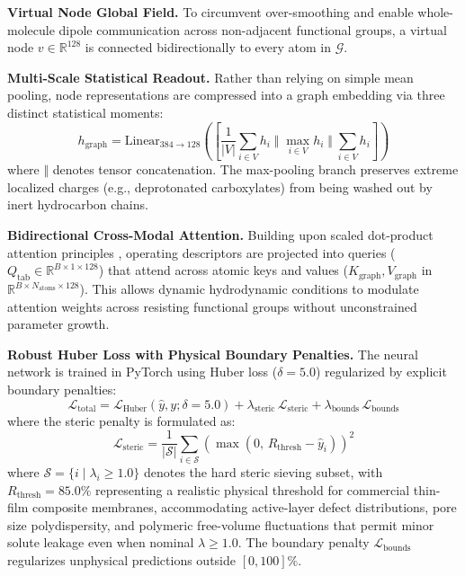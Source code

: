 \documentclass[11pt]{article}
\begin{document}
\textbf{Virtual Node Global Field.} To circumvent over-smoothing and enable whole-molecule dipole communication across non-adjacent functional groups, a virtual node $v \in \mathbb{R}^{128}$ is connected bidirectionally to every atom in $\mathcal{G}$.

\textbf{Multi-Scale Statistical Readout.} Rather than relying on simple mean pooling, node representations are compressed into a graph embedding via three distinct statistical moments:
\begin{equation}
h_{\mathrm{graph}} = \mathrm{Linear}_{384 \to 128} \left( \left[ \frac{1}{|V|}\sum_{i \in V} h_i \; \Big\Vert \; \max_{i \in V} h_i \; \Big\Vert \; \sum_{i \in V} h_i \right] \right)
\label{eq:readout}
\end{equation}
where $\Vert$ denotes tensor concatenation. The max-pooling branch preserves extreme localized charges (e.g., deprotonated carboxylates) from being washed out by inert hydrocarbon chains.

\textbf{Bidirectional Cross-Modal Attention.} Building upon scaled dot-product attention principles \cite{vaswani2017}, operating descriptors are projected into queries ($Q_{\mathrm{tab}} \in \mathbb{R}^{B \times 1 \times 128}$) that attend across atomic keys and values ($K_{\mathrm{graph}}, V_{\mathrm{graph}}$ in $\mathbb{R}^{B \times N_{\mathrm{atoms}} \times 128}$). This allows dynamic hydrodynamic conditions to modulate attention weights across resisting functional groups without unconstrained parameter growth.

\textbf{Robust Huber Loss with Physical Boundary Penalties.} The neural network is trained in PyTorch \cite{paszke2019} using Huber loss ($\delta = 5.0$) regularized by explicit boundary penalties:
\begin{equation}
\mathcal{L}_{\mathrm{total}} = \mathcal{L}_{\mathrm{Huber}}(\hat{y}, y; \delta = 5.0) + \lambda_{\mathrm{steric}}\,\mathcal{L}_{\mathrm{steric}} + \lambda_{\mathrm{bounds}}\,\mathcal{L}_{\mathrm{bounds}}
\label{eq:loss}
\end{equation}
where the steric penalty is formulated as:
\begin{equation}
\mathcal{L}_{\mathrm{steric}} = \frac{1}{|\mathcal{S}|} \sum_{i \in \mathcal{S}} \left( \max\left(0,\, R_{\mathrm{thresh}} - \hat{y}_i\right) \right)^2
\label{eq:steric_loss}
\end{equation}
where $\mathcal{S} = \{i \mid \lambda_i \ge 1.0\}$ denotes the hard steric sieving subset, with $R_{\mathrm{thresh}} = 85.0\%$ representing a realistic physical threshold for commercial thin-film composite membranes, accommodating active-layer defect distributions, pore size polydispersity, and polymeric free-volume fluctuations that permit minor solute leakage even when nominal $\lambda \ge 1.0$. The boundary penalty $\mathcal{L}_{\mathrm{bounds}}$ regularizes unphysical predictions outside $[0, 100]\%$.
\end{document}
